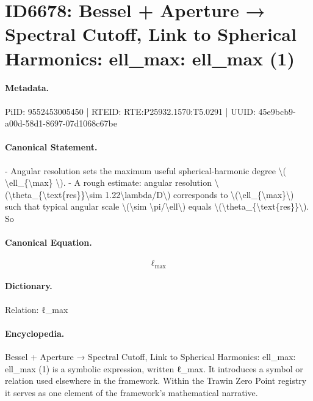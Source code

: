 \section*{ID6678: Bessel + Aperture → Spectral Cutoff, Link to Spherical Harmonics: ell\_max: ell\_max (1)}
\paragraph{Metadata.}
PiID: 9552453005450 | RTEID: RTE:P25932.1570:T5.0291 | UUID: 45e9bcb9-a00d-58d1-8697-07d1068c67be

\paragraph{Canonical Statement.}
- Angular resolution sets the maximum useful spherical-harmonic degree \textbackslash{}( \textbackslash{}ell\_\{\textbackslash{}max\} \textbackslash{}). - A rough estimate: angular resolution \textbackslash{}(\textbackslash{}theta\_\{\textbackslash{}text\{res\}\}\textbackslash{}sim 1.22\textbackslash{}lambda/D\textbackslash{}) corresponds to \textbackslash{}(\textbackslash{}ell\_\{\textbackslash{}max\}\textbackslash{}) such that typical angular scale \textbackslash{}(\textbackslash{}sim \textbackslash{}pi/\textbackslash{}ell\textbackslash{}) equals \textbackslash{}(\textbackslash{}theta\_\{\textbackslash{}text\{res\}\}\textbackslash{}). So

\paragraph{Canonical Equation.}
\[
\ell_{\max}
\]

\paragraph{Dictionary.}
Relation: ℓ\_max

\paragraph{Encyclopedia.}
Bessel + Aperture → Spectral Cutoff, Link to Spherical Harmonics: ell\_max: ell\_max (1) is a symbolic expression, written ℓ\_max. It introduces a symbol or relation used elsewhere in the framework. Within the Trawin Zero Point registry it serves as one element of the framework's mathematical narrative.
